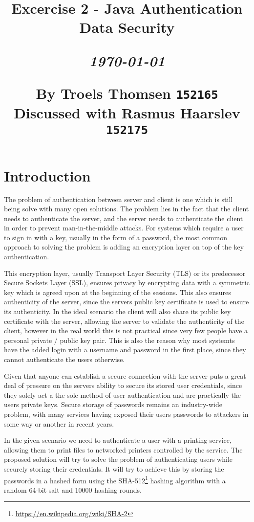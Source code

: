 \documentclass[12pt]{article}
\title{
  \vspace{4cm}
  \begin{flushleft}
  \Large{\textbf{Excercise 2 - Java Authentication}} \\
  \large{Data Security} \\
  \end{flushleft}
  \vspace{0cm}
  \begin{flushleft}
  \small
  \textit{\today}
  \end{flushleft}
  \vspace{12cm}
  \begin{flushleft}
  \small
  By Troels Thomsen \texttt{152165}\\
  Discussed with Rasmus Haarslev \texttt{152175}
  \end{flushleft}
}
\date{
}
\begin{document}
\clearpage
{}
\thispagestyle{empty}
\maketitle

\newpage

\tableofcontents

\newpage


\section{Introduction}
\label{sec:Introduction (1 page)}

The problem of authentication between server and client is one which is still being solve with many open solutions. The problem lies in the fact that the client needs to authenticate the server, and the server needs to authenticate the client in order to prevent man-in-the-middle attacks. For systems which require a user to sign in with a key, usually in the form of a password, the most common approach to solving the problem is adding an encryption layer on top of the key authentication.

This encryption layer, usually Transport Layer Security (TLS) or its predecessor Secure Sockets Layer (SSL), ensures privacy by encrypting data with a symmetric key which is agreed upon at the beginning of the sessions. This also ensures authenticity of the server, since the servers public key certificate is used to ensure its authenticity. In the ideal scenario the client will also share its public key certificate with the server, allowing the server to validate the authenticity of the client, however in the real world this is not practical since very few people have a personal private / public key pair. This is also the reason why most systemts have the added login with a username and password in the first place, since they cannot authenticate the users otherwise.

Given that anyone can establish a secure connection with the server puts a great deal of pressure on the servers ability to secure its stored user credentials, since they solely act a the sole method of user authentication and are practically the users private keys. Secure storage of passwords remains an industry-wide problem, with many services having exposed their users passwords to attackers in some way or another in recent years.

In the given scenario we need to authenticate a user with a printing service, allowing them to print files to networked printers controlled by the service. The proposed solution will try to solve the problem of authenticating users while securely storing their credentials. It will try to achieve this by storing the passwords in a hashed form using the SHA-512\footnote{\url{https://en.wikipedia.org/wiki/SHA-2}} hashing algorithm with a random 64-bit salt and 10000 hashing rounds.
\end{document}
